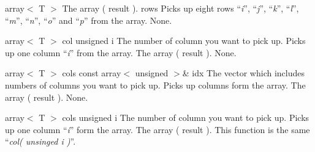 \clearpage

\setConstInstance
\setCorrectWidthThree{8pt}
\printMethodWithParamsSaved
{array$<$ T $>$}
{The array ( result ).}
{rows}
{Picks up eight rows ``{\em i}'', ``{\em j}'', ``{\em k}'', ``{\em l}'', ``{\em m}'', ``{\em n}'', ``{\em o}'' and ``{\em p}'' from the array.}
{None.}
\setCorrectWidthThree{4pt}

\setConstInstance
\printMethodWithOneParam
{array$<$ T $>$}
{col}
{unsigned}
{i}
{The number of column you want to pick up.}
{Picks up one column ``{\em i}'' from the array.}
{The array ( result ).}
{None.}

\setConstInstance
\printMethodWithOneParam
{array$<$ T $>$}
{cols}
{const array$<$ unsigned $>$\&}
{idx}
{The vector which includes numbers of columns you want to pick up.}
{Picks up columns form the array.}
{The array ( result ).}
{None.}

\clearpage

\setConstInstance
\printMethodWithOneParam
{array$<$ T $>$}
{cols}
{unsigned}
{i}
{The number of column you want to pick up.}
{Picks up one column ``{\em i}'' form the array.}
{The array ( result ).}
{This function is the same ``{\em col( unsinged i )}''.}

